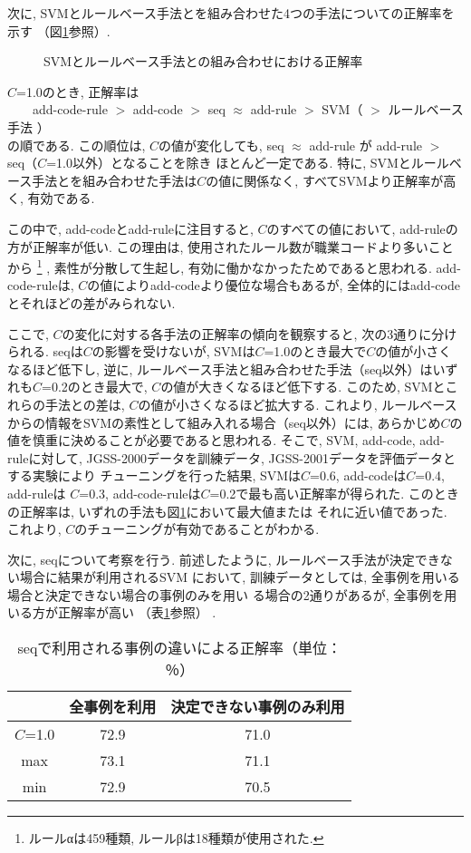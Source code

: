\documentclass{nlp}
\begin{document}
次に, SVMとルールベース手法とを組み合わせた4つの手法についての正解率を示す
（図\ref{figure000102}参照）. 
\begin{figure}
\caption{SVMとルールベース手法との組み合わせにおける正解率}
\label{figure000102}
\end{figure}
$C$=1.0のとき, 正解率は\vspace{2mm}\\
　　add-code-rule $>$ add-code $>$ seq $\approx$ add-rule $>$ SVM（ $>$ ルールベース手法 ）\vspace{2mm}\\
の順である. 
この順位は, $C$の値が変化しても, 
seq $\approx$ add-rule が add-rule $>$ seq（$C$=1.0以外）となることを除き
ほとんど一定である. 
特に, SVMとルールベース手法とを組み合わせた手法は$C$の値に関係なく, 
すべてSVMより正解率が高く, 有効である. 

この中で, add-codeとadd-ruleに注目すると, 
$C$のすべての値において, add-ruleの方が正解率が低い. 
この理由は, 使用されたルール数が職業コードより多いことから
\footnote{ルールαは459種類, ルールβは18種類が使用された. }
, 
素性が分散して生起し, 有効に働かなかったためであると思われる. 
add-code-ruleは, 
$C$の値によりadd-codeより優位な場合もあるが, 
全体的にはadd-codeとそれほどの差がみられない. 

ここで, $C$の変化に対する各手法の正解率の傾向を観察すると, 
次の3通りに分けられる. 
seqは$C$の影響を受けないが, 
SVMは$C$=1.0のとき最大で$C$の値が小さくなるほど低下し, 
逆に, ルールベース手法と組み合わせた手法（seq以外）はいずれも$C$=0.2のとき最大で, $C$の値が大きくなるほど低下する. 
このため, SVMとこれらの手法との差は, $C$の値が小さくなるほど拡大する. 
これより, ルールベースからの情報をSVMの素性として組み入れる場合（seq以外）には, 
あらかじめ$C$の値を慎重に決めることが必要であると思われる. 
そこで, SVM, add-code, add-ruleに対して, 
JGSS-2000データを訓練データ, 
JGSS-2001データを評価データとする実験により
チューニングを行った結果, SVMは$C$=0.6, add-codeは$C$=0.4, add-ruleは
$C$=0.3, add-code-ruleは$C$=0.2で最も高い正解率が得られた. 
このときの正解率は, 
いずれの手法も図\ref{figure000102}において最大値または
それに近い値であった. 
これより, 
$C$のチューニングが有効であることがわかる. 

次に, seqについて考察を行う. 
前述したように, ルールベース手法が決定できない場合に結果が利用されるSVM
において, 
訓練データとしては, 全事例を用いる場合と決定できない場合の事例のみを用い
る場合の2通りがあるが, 
全事例を用いる方が正解率が高い
（表\ref{onedataset2}参照）
. 
\begin{table}
\begin{center}
\caption{seqで利用される事例の違いによる正解率（単位：％）}
\begin{tabular}{c|c|c}
\hline\hline
&全事例を利用&決定できない事例のみ利用\\
\hline
$C$=1.0&72.9&71.0\\
max&73.1&71.1\\
min&72.9&70.5\\
\hline
\end{tabular}
\label{onedataset2}
\end{center}
\end{table}
 
\end{document}
